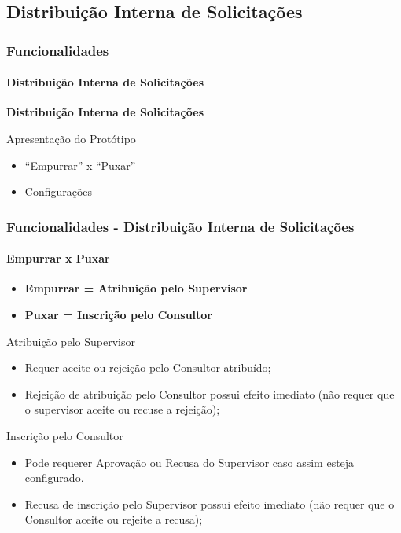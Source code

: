 \subsection{Distribuição Interna de Solicitações}

\begin{frame}
	\frametitle{Funcionalidades}
	\framesubtitle{Distribuição Interna de Solicitações}

	\textbf{Distribuição Interna de Solicitações}
	\begin{block}{Apresentação do Protótipo}
		\begin{itemize}
			\item ``Empurrar'' x  ``Puxar''
			\item Configurações
		\end{itemize}
	\end{block}	
\end{frame}


\begin{frame}
	\frametitle{Funcionalidades - Distribuição Interna de Solicitações}
	\framesubtitle{Empurrar x Puxar}

	\begin{itemize}
		\item \textbf{Empurrar = Atribuição pelo Supervisor}
		\item \textbf{Puxar = Inscrição pelo Consultor}
	\end{itemize}


		\begin{block}{Atribuição pelo Supervisor}
			\begin{itemize}
				\item Requer aceite ou rejeição pelo Consultor atribuído;
				\item Rejeição de atribuição pelo Consultor possui efeito imediato (não requer que o supervisor aceite ou recuse a rejeição);
			\end{itemize}
		\end{block}	


		\begin{block}{Inscrição pelo Consultor}
			\begin{itemize}
				\item Pode requerer Aprovação ou Recusa do Supervisor caso assim esteja configurado.
				
				\item Recusa de inscrição pelo Supervisor possui efeito imediato (não requer que o Consultor aceite ou rejeite a recusa);
			\end{itemize}
		\end{block}	



	\end{frame}




